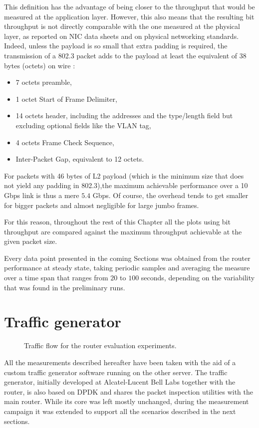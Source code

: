 \documentclass[11pt,a4paper,twoside,titlepage,openany]{book}
\begin{document}
This definition has the advantage of being closer to the throughput that would be measured at the application layer. However, this also means that the resulting bit throughput is not directly comparable with the one measured at the physical layer, as reported on NIC data sheets and on physical networking standards.
Indeed, unless the payload is so small that extra padding is required, the transmission of a 802.3 packet adds to the payload at least the equivalent of 38 bytes (octets) on wire \cite{ethernet}:
\begin{itemize}[noitemsep,nolistsep]
\item 7 octets preamble,
\item 1 octet Start of Frame Delimiter,
\item 14 octets header, including the addresses and the type/length field but excluding optional fields like the VLAN tag,
\item 4 octets Frame Check Sequence,
\item Inter-Packet Gap, equivalent to 12 octets.
\end{itemize}
For packets with 46 bytes of L2 payload (which is the minimum size that does not yield any padding in 802.3),the maximum achievable performance over a 10 Gbps link is thus a mere $5.4$ Gbps. Of course, the overhead tends to get smaller for bigger packets and almost negligible for large jumbo frames.

For this reason, throughout the rest of this Chapter all the plots using bit throughput are compared against the maximum throughput achievable at the given packet size.

Every data point presented in the coming Sections was obtained from the router performance at steady state, taking periodic samples and averaging the measure over a time span that ranges from $20$ to $100$ seconds, depending on the variability that was found in the preliminary runs.

\section{Traffic generator}\label{sec:test.traffgen}
\begin{figure}[tb]
  \begin{center}
    
    \caption{Traffic flow for the router evaluation experiments.}
    \label{fig:test.flow}
  \end{center}
\end{figure}
All the measurements described hereafter have been taken with the aid of a custom traffic generator software running on the other server. The traffic generator, initially developed at Alcatel-Lucent Bell Labs together with the router, is also based on DPDK and shares the packet inspection utilities with the main router. While its core was left mostly unchanged, during the measurement campaign it was extended to support all the scenarios described in the next sections.
\end{document}
